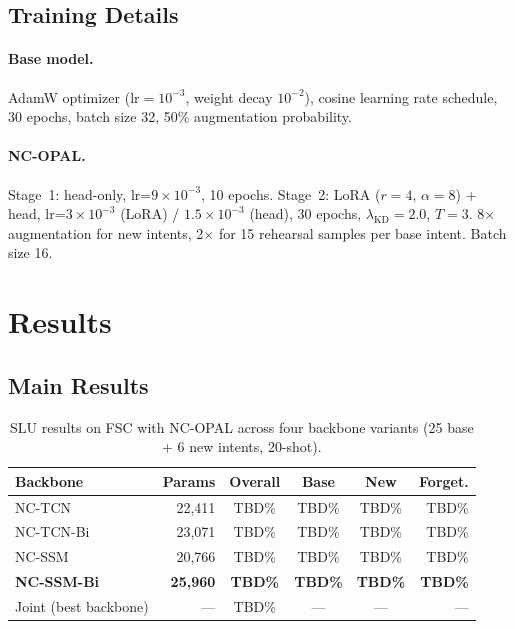 \documentclass[11pt]{article}
\begin{document}
\subsection{Training Details}

\paragraph{Base model.}
AdamW optimizer \cite{loshchilov2019adamw} ($\text{lr}=10^{-3}$, weight decay $10^{-2}$), cosine learning rate schedule, 30 epochs, batch size 32, 50\% augmentation probability.

\paragraph{NC-OPAL.}
Stage~1: head-only, lr=$9 \times 10^{-3}$, 10 epochs.
Stage~2: LoRA ($r=4$, $\alpha=8$) + head, lr=$3 \times 10^{-3}$ (LoRA) / $1.5 \times 10^{-3}$ (head), 30 epochs, $\lambda_{\text{KD}}=2.0$, $T=3$.
8$\times$ augmentation for new intents, 2$\times$ for 15 rehearsal samples per base intent.
Batch size 16.

\section{Results}

\subsection{Main Results}

\begin{table}[t]
\centering
\small
\caption{SLU results on FSC with NC-OPAL across four backbone variants (25 base + 6 new intents, 20-shot).}
\label{tab:main}
\begin{tabular}{@{}lrcccr@{}}
\toprule
\textbf{Backbone} & \textbf{Params} & \textbf{Overall} & \textbf{Base} & \textbf{New} & \textbf{Forget.} \\
\midrule
NC-TCN       & 22,411 & TBD\% & TBD\% & TBD\% & TBD\% \\
NC-TCN-Bi    & 23,071 & TBD\% & TBD\% & TBD\% & TBD\% \\
NC-SSM       & 20,766 & TBD\% & TBD\% & TBD\% & TBD\% \\
\textbf{NC-SSM-Bi} & \textbf{25,960} & \textbf{TBD\%} & \textbf{TBD\%} & \textbf{TBD\%} & \textbf{TBD\%} \\
\midrule
Joint (best backbone) & --- & TBD\% & --- & --- & --- \\
\bottomrule
\end{tabular}
\end{table}
\end{document}
